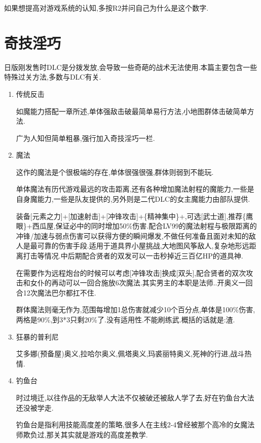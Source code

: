 	{\color{red}如果想提高对游戏系统的认知,多按R2并问自己为什么是这个数字.}

	\newpage

	\section{奇技淫巧}

	日版刚发售时DLC是分拨发放,会导致一些奇葩的战术无法使用.本篇主要包含一些特殊过关方法,多数与DLC有关.

	\begin{enumerate}

		\item{传统反击}

		如魔能力搭配一章所述,单体强敌击破最简单易行方法,小地图群体击破简单方法.

		广为人知但简单粗暴,强行加入奇技淫巧一栏.

		\item{魔法}

		这作的魔法是个很极端的存在,单体很强很强,群体则弱到不能玩.

		单体魔法有历代游戏最远的攻击距离,还有各种增加魔法射程的魔能力,一些是自身魔能力,一些是队友提供的,另外则是二代DLC的女主魔能力由部队提供.

		装备[元素之力]+[加速射击]+[冲锋攻击]+\{精神集中\}+,可选[武士道],推荐\{鹰眼\}+西瓜屋,保证必中的同时增加50\%伤害.配合LV99的魔法射程与极限距离的冲锋/加速与弱点伤害可以获得方便的瞬间爆发,不做任何准备且面对未知的敌人是最可靠的伤害手段.适用于道具界小屋挑战,大地图风筝敌人,复杂地形远距离打击等情况.中后期配合贤者的双发可以一击秒掉近三百亿HP的道具神.

		在需要作为远程炮台的时候可以考虑[冲锋攻击]换成[双头],配合贤者的双次攻击和女仆的再动可以一回合施放6次魔法.其实男主的本职是法师..开奥义一回合12次魔法巴尔都扛不住.

		群体魔法则毫无作为,范围每增加1总伤害就减少10个百分点,单体是100\%伤害,两格是90\%,到3*3只剩20\%了.没有适用性.不能刷练武.概括的话就是:渣.


		\item{狂暴的普利尼}

		艾多娜(预备屋)奥义,拉哈尔奥义,佩塔奥义,玛裘丽特奥义,死神的行进,战斗热情.

		\item{钓鱼台}

		时过境迁,以往作品的无敌举人大法不仅被破还被敌人学了去,好在钓鱼台大法还没被学走.

		钓鱼台是指利用技能高度差的策略,很多人在主线2-4曾经被那个高冷的女魔法师欺负过,那关其实就是游戏的高度差教学.


\end{enumerate}
